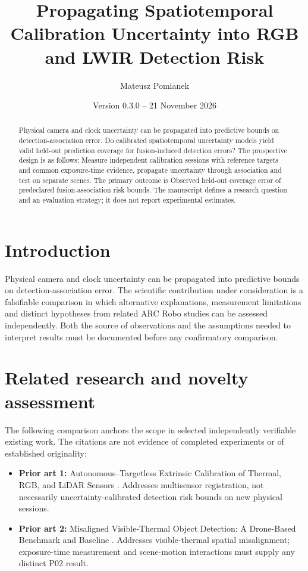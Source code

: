 \documentclass[11pt,a4paper]{article}
\title{Propagating Spatiotemporal Calibration Uncertainty into RGB and LWIR Detection Risk}
\author{Mateusz Pomianek}
\date{Version 0.3.0 -- 21 November 2026}
\begin{document}
\maketitle

\begin{abstract}
Physical camera and clock uncertainty can be propagated into predictive bounds on detection-association error. Do calibrated spatiotemporal uncertainty models yield valid held-out prediction coverage for fusion-induced detection errors? The prospective design is as follows: Measure independent calibration sessions with reference targets and common exposure-time evidence, propagate uncertainty through association and test on separate scenes. The primary outcome is Observed held-out coverage error of predeclared fusion-association risk bounds. The manuscript defines a research question and an evaluation strategy; it does not report experimental estimates.
\end{abstract}

\section{Introduction}
Physical camera and clock uncertainty can be propagated into predictive bounds on detection-association error. The scientific contribution under consideration is a falsifiable comparison in which alternative explanations, measurement limitations and distinct hypotheses from related ARC Robo studies can be assessed independently. Both the source of observations and the assumptions needed to interpret results must be documented before any confirmatory comparison.

\section{Related research and novelty assessment}
The following comparison anchors the scope in selected independently verifiable existing work. The citations are not evidence of completed experiments or of established originality:
\begin{itemize}
\item \textbf{Prior art 1:} Autonomous--Targetless Extrinsic Calibration of Thermal, RGB, and LiDAR Sensors \cite{source1}. Addresses multisensor registration, not necessarily uncertainty-calibrated detection risk bounds on new physical sessions.
\item \textbf{Prior art 2:} Misaligned Visible-Thermal Object Detection: A Drone-Based Benchmark and Baseline \cite{source2}. Addresses visible-thermal spatial misalignment; exposure-time measurement and scene-motion interactions must supply any distinct P02 result.
\end{itemize}
\end{document}
